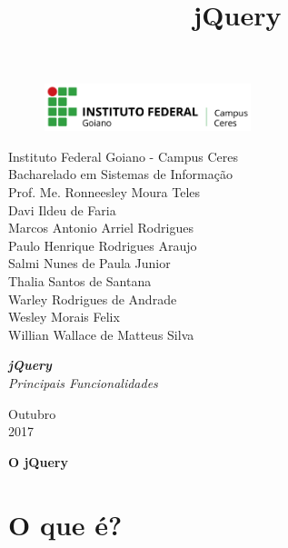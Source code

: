 \documentclass[12pt,a4paper]{article}
\title{jQuery}
\begin{document}
\begin{titlepage}


\begin{center}
\begin{figure}[htb]
		
		\label{figura:LogoIF}
	
		\centering
		\includegraphics[width=6cm]{logo.png} 
\end{figure}


Instituto Federal Goiano - Campus Ceres\\
Bacharelado em Sistemas de Informação\\
Prof. Me. Ronneesley Moura Teles\\\vspace{0.2cm}
Davi Ildeu de Faria \\
Marcos Antonio Arriel Rodrigues \\
Paulo Henrique Rodrigues Araujo \\
Salmi Nunes de Paula Junior \\
Thalia Santos de Santana\\
Warley Rodrigues de Andrade \\
Wesley Morais Felix \\
Willian Wallace de Matteus Silva\\\vspace{6.0cm}

\textit{\textbf{\Large{jQuery}}}\\\vspace{0.5cm}
\textit{\Large{Principais Funcionalidades}}\\\vspace{8.5cm}

Outubro\\
2017\\
\end{center}
\end{titlepage}



\tableofcontents

\newpage
\begin{center}
\textbf{\Large{O jQuery}}\\\vspace{0.5cm}
\end{center}
\section{O que é?}%
\end{document}
